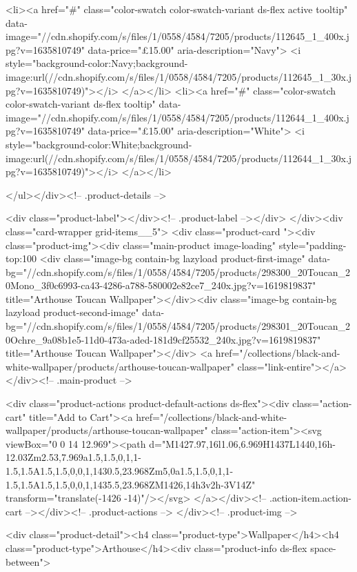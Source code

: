 {{{{{{{<li><a href="#" class="color-swatch color-swatch-variant ds-flex active tooltip" data-image="//cdn.shopify.com/s/files/1/0558/4584/7205/products/112645_1_400x.jpg?v=1635810749" data-price="£15.00" aria-description="Navy">
              <i style="background-color:Navy;background-image:url(//cdn.shopify.com/s/files/1/0558/4584/7205/products/112645_1_30x.jpg?v=1635810749)"></i>
            </a></li>
<li><a href="#" class="color-swatch color-swatch-variant ds-flex tooltip" data-image="//cdn.shopify.com/s/files/1/0558/4584/7205/products/112644_1_400x.jpg?v=1635810749" data-price="£15.00" aria-description="White">
              <i style="background-color:White;background-image:url(//cdn.shopify.com/s/files/1/0558/4584/7205/products/112644_1_30x.jpg?v=1635810749)"></i>
            </a></li>

      </ul></div><!-- .product-details -->

<div class="product-label"></div><!-- .product-label --></div>
          </div><div class="card-wrapper grid-items__5">
            <div class="product-card "><div class="product-img"><div class="main-product image-loading" style="padding-top:100%
      <div class="image-bg contain-bg lazyload product-first-image" data-bg="//cdn.shopify.com/s/files/1/0558/4584/7205/products/298300_20Toucan_20Mono_3f0c6993-ca43-4286-a788-580002e82ce7_240x.jpg?v=1619819837" title="Arthouse Toucan Wallpaper"></div><div class="image-bg contain-bg lazyload product-second-image" data-bg="//cdn.shopify.com/s/files/1/0558/4584/7205/products/298301_20Toucan_20Ochre_9a08b1e5-11d0-473a-aded-181d9cf25532_240x.jpg?v=1619819837" title="Arthouse Toucan Wallpaper"></div>
      <a href="/collections/black-and-white-wallpaper/products/arthouse-toucan-wallpaper" class="link-entire"></a>
    </div><!-- .main-product -->
  
<div class="product-actions product-default-actions ds-flex"><div class="action-cart" title="Add to Cart"><a href="/collections/black-and-white-wallpaper/products/arthouse-toucan-wallpaper" class="action-item"><svg viewBox="0 0 14 12.969"><path d="M1427.97,16l1.06,6.969H1437L1440,16h-12.03Zm2.53,7.969a1.5,1.5,0,1,1-1.5,1.5A1.5,1.5,0,0,1,1430.5,23.968Zm5,0a1.5,1.5,0,1,1-1.5,1.5A1.5,1.5,0,0,1,1435.5,23.968ZM1426,14h3v2h-3V14Z" transform="translate(-1426 -14)"/></svg>
</a></div><!-- .action-item.action-cart --></div><!-- .product-actions -->
</div><!-- .product-img -->

<div class="product-detail"><h4 class="product-type">Wallpaper</h4><h4 class="product-type">Arthouse</h4><div class="product-info ds-flex space-between">
    
}}}}}}}
